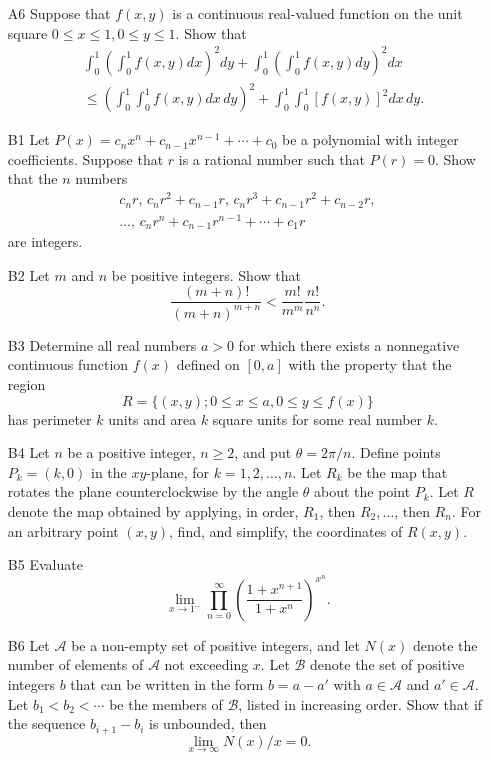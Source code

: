 \documentclass[amssymb,twocolumn,pra,10pt,aps]{revtex4-1}
\begin{document}
\begin{itemize}
\item[A6]
Suppose that $f(x,y)$ is a continuous real-valued function on the unit
square $0 \le x \le 1, 0 \le y \le 1$.  Show that
\begin{align*}
& \int_0^1 \left( \int_0^1  f(x,y) dx \right)^2 dy +
 \int_0^1 \left( \int_0^1  f(x,y) dy \right)^2 dx \\
&\leq
\left( \int_0^1 \int_0^1  f(x,y) dx\, dy \right)^2 +
\int_0^1 \int_0^1 \left[ f(x,y) \right]^2 dx\,dy.
\end{align*}

\item[B1]
Let $P(x) = c_n x^n + c_{n-1} x^{n-1} + \cdots + c_0$ be a polynomial with
integer coefficients. Suppose that $r$ is a rational number such that
$P(r) = 0$.  Show that the $n$ numbers
\begin{gather*}
c_n r, \, c_n r^2 + c_{n-1} r, \, c_n r^3 + c_{n-1} r^2 + c_{n-2} r, \\
\dots, \, c_n r^n + c_{n-1} r^{n-1} + \cdots + c_1 r
\end{gather*}
are integers.

\item[B2]
Let $m$ and $n$ be positive integers.  Show that
\[
\frac{(m+n)!}{(m+n)^{m+n}}
< \frac{m!}{m^m} \frac{n!}{n^n}.
\]

\item[B3]
Determine all real numbers $a > 0$ for which there exists a nonnegative
continuous function $f(x)$ defined on $[0,a]$ with the property that the
region
\[
R = \{ (x,y) ; 0
\le x \le a, 0 \le y \le
f(x) \}
\]
has perimeter $k$ units and area $k$ square units for some real number $k$.

\item[B4]
Let $n$ be a positive integer, $n \ge
2$, and put  $\theta = 2 \pi / n$.
Define points $P_k = (k,0)$ in the $xy$-plane, for $k = 1, 2
, \dots, n$.
Let $R_k$ be the map that rotates the plane counterclockwise by the
angle $\theta$ about the point $P_k$.  Let $R$ denote the map obtained
by applying, in order, $R_1$,  then $R_2, \dots$,
then $R_n$.
For an arbitrary point $(x,y)$, find, and simplify, the coordinates
of $R(x,y)$.

\item[B5]
Evaluate
\[
\lim_{x \to 1^-} \prod_{n=0}^\infty \left(\frac{1 + x^{n+1}}{1 +
x^n}\right)^{x^n}.
\]

\item[B6]
Let $\mathcal{A}$
be a non-empty set of positive integers, and let $N(x)$ denote
the number of elements of $\mathcal{A}$ not exceeding $x$.
Let $\mathcal{B}$ denote the set
of positive integers $b$ that can be written in the form $b = a - a'$ with
$a \in \mathcal{A}$  and $a' \in  \mathcal{A}$. Let $b_1 < b_2 < \cdots$
be the members of $\mathcal{B}$,
listed in increasing order. Show that if the sequence $b_{i+1} - b_i$ is
unbounded, then
\[
\lim_{x \to\infty}  N(x)/x  = 0.
\]

\end{itemize}
\end{document}
